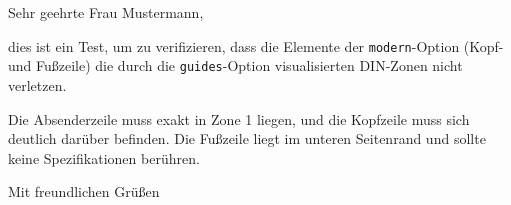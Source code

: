 \documentclass[modern, guides, footercenter]{../onlinebrief24}
\begin{document}
\begin{letter}{}
    \opening{Sehr geehrte Frau Mustermann,}
    
    dies ist ein Test, um zu verifizieren, dass die Elemente der \texttt{modern}-Option (Kopf- und Fußzeile) die durch die \texttt{guides}-Option visualisierten DIN-Zonen nicht verletzen.
    
    Die Absenderzeile muss exakt in Zone 1 liegen, und die Kopfzeile muss sich deutlich darüber befinden. Die Fußzeile liegt im unteren Seitenrand und sollte keine Spezifikationen berühren.
    
    \closing{Mit freundlichen Grüßen}
\end{letter}
\end{document}
